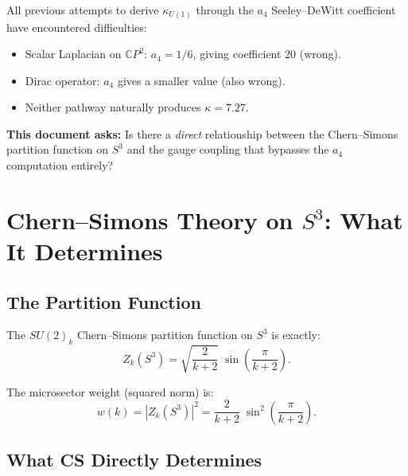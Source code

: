 \documentclass[12pt,a4paper]{article}
\theoremstyle{definition}
\theoremstyle{remark}
\begin{document}
All previous attempts to derive $\kappa_{U(1)}$ through the $a_4$
Seeley--DeWitt coefficient have encountered difficulties:
\begin{itemize}
\item Scalar Laplacian on $\mathbb{C}P^2$: $a_4 = 1/6$, giving
  coefficient 20 (wrong).
\item Dirac operator: $a_4$ gives a smaller value (also wrong).
\item Neither pathway naturally produces $\kappa = 7.27$.
\end{itemize}

\textbf{This document asks:} Is there a \emph{direct} relationship between
the Chern--Simons partition function on $S^3$ and the gauge coupling that
bypasses the $a_4$ computation entirely?

\section{Chern--Simons Theory on $S^3$: What It Determines}
\label{sec:CS-theory}

\subsection{The Partition Function}

The $SU(2)_k$ Chern--Simons partition function on $S^3$ is exactly:
\begin{equation}
Z_k(S^3) = \sqrt{\frac{2}{k+2}}\;\sin\!\left(\frac{\pi}{k+2}\right).
\end{equation}

The microsector weight (squared norm) is:
\begin{equation}
w(k) = |Z_k(S^3)|^2 = \frac{2}{k+2}\;\sin^2\!\left(\frac{\pi}{k+2}\right).
\end{equation}

\subsection{What CS Directly Determines}
\end{document}
